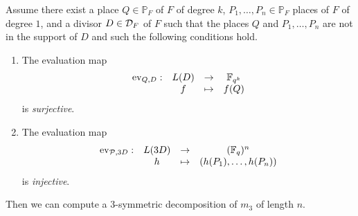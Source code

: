 \documentclass[a4paper,11pt]{article}
\begin{document}
\begin{prop}
  \label{prop:method}
  Assume there exist a place $Q\in\mathbb{P}_{F}$ of $F$ of degree $k$, $P_1,
  \dots, P_n\in\mathbb{P}_F$ places of $F$ of degree $1$, and a divisor
  $D\in\mathcal{D}_F$ of $F$ such that the places $Q$ and $P_1, \dots, P_n$ are not in
  the support of $D$ and such the following conditions hold.
  \begin{enumerate}
    \item \label{cond:1} The evaluation map
      \[
        \begin{array}{cccc}
        \operatorname{ev}_{Q, D}: & L(D) & \to & \mathbb{F}_{q^k}\\
  & f & \mapsto & f(Q)
\end{array}
\]
is \emph{surjective}.
    \item \label{cond:2} The evaluation map
      \[
        \begin{array}{cccc}
        \operatorname{ev}_{\mathcal{P}, 3D}: & L(3D) & \to & (\mathbb{F}_{q})^n\\
  & h & \mapsto & (h(P_1), \dots, h(P_n))
\end{array}
\]
is \emph{injective}.
  \end{enumerate}
  Then we can compute a $3$-symmetric decomposition of $m_3$ of length $n$.
\end{prop}
\end{document}
